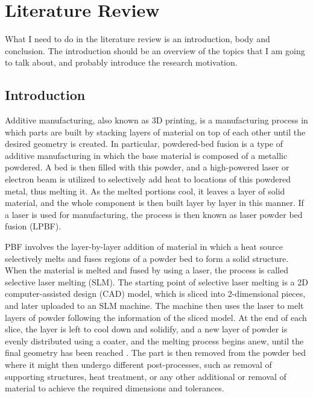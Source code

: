 \documentclass[../main.tex]{subfiles}
\begin{document}
	
\chapter{Literature Review}

What I need to do in the literature review is an introduction, body and conclusion. The introduction should be an overview of the topics that I am going to talk about, and probably introduce the research motivation.

\section{Introduction}

Additive manufacturing, also known as 3D printing, is a manufacturing process in which parts are built by stacking layers of material on top of each other until the desired geometry is created. In particular, powdered-bed fusion is a type of additive manufacturing in which the base material is composed of a metallic powdered. A bed is then filled with this powder, and a high-powered laser or electron beam is utilized to selectively add heat to locations of this powdered metal, thus melting it. As the melted portions cool, it leaves a layer of solid material, and the whole component is then built layer by layer in this manner. If a laser is used for manufacturing, the process is then known as laser powder bed fusion (LPBF).

PBF involves the layer-by-layer addition of material in which a heat source selectively melts and fuses regions of a powder bed to form a solid structure. When the material is melted and fused by using a laser, the process is called selective laser melting (SLM). The starting point of selective laser melting is a 2D computer-assisted design (CAD) model, which is sliced into 2-dimensional pieces, and later uploaded to an SLM machine. The machine then uses the laser to melt layers of powder following the information of the sliced model. At the end of each slice, the layer is left to cool down and solidify, and a new layer of powder is evenly distributed using a coater, and the melting process begins anew, until the final geometry has been reached \cite{valinoAdvances3DPrinting2019}. The part is then removed from the powder bed where it might then undergo different post-processes, such as removal of supporting structures, heat treatment, or any other additional or removal of material to achieve the required dimensions and tolerances. 
\end{document}

